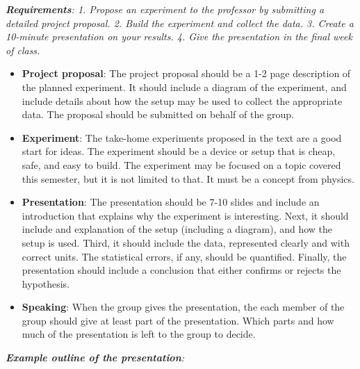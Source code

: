 \documentclass[10pt]{article}
\begin{document}
\maketitle

\noindent
\textit{\textbf{Requirements}: 1. Propose an experiment to the professor by submitting a detailed project proposal.  2. Build the experiment and collect the data.  3. Create a 10-minute presentation on your results.  4. Give the presentation in the final week of class.} \\
\begin{itemize}
\item\textbf{ Project proposal}: The project proposal should be a 1-2 page description of the planned experiment.  It should include a diagram of the experiment, and include details about how the setup may be used to collect the appropriate data.  The proposal should be submitted on behalf of the group.
\item \textbf{Experiment}: The take-home experiments proposed in the text are a good start for ideas.  The experiment should be a device or setup that is cheap, safe, and easy to build.  The experiment may be focused on a topic covered this semester, but it is not limited to that.  It must be a concept from physics.
\item \textbf{Presentation}: The presentation should be 7-10 slides and include an introduction that explains why the experiment is interesting.  Next, it should include and explanation of the setup (including a diagram), and how the setup is used.  Third, it should include the data, represented clearly and with correct units.  The statistical errors, if any, should be quantified.  Finally, the presentation should include a conclusion that either confirms or rejects the hypothesis.
\item \textbf{Speaking}: When the group gives the presentation, the each member of the group should give at least part of the presentation.  Which parts and how much of the presentation is left to the group to decide.
\end{itemize}
\textit{\textbf{Example outline of the presentation}:}
\end{document}
